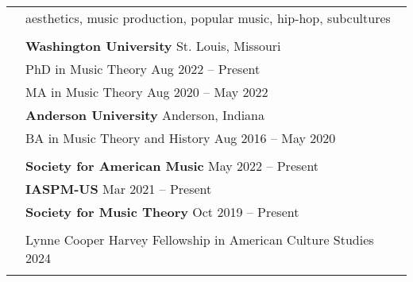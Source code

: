 \documentclass[letterpaper, 11pt]{article}
\begin{document}
\begin{longtable}{p{1.3in}p{4.8in}}

\nohyphens{\color{OliveGreen}{Research interests}}
& aesthetics, music production, popular music, hip-hop, subcultures \\
& \\

\color{OliveGreen}{Education} 
& \textbf{Washington University} \hfill St. Louis, Missouri \\
& PhD in Music Theory \hfill Aug 2022 -- Present \\
& MA in Music Theory \hfill Aug 2020 -- May 2022\\
& \textbf{Anderson University} \hfill Anderson, Indiana \\
& BA in Music Theory and History \hfill Aug 2016 -- May 2020 \\
&\\

{\color{OliveGreen}{Memberships}} 
& \textbf{Society for American Music} \hfill May 2022 -- Present \\
& \textbf{IASPM-US} \hfill Mar 2021 -- Present \\
& \textbf{Society for Music Theory} \hfill Oct 2019 -- Present \\
& \\

{\color{OliveGreen}{Fellowships}}
& Lynne Cooper Harvey Fellowship in American Culture Studies \hfill 2024 \\
& \\



\end{longtable}
\end{document}
